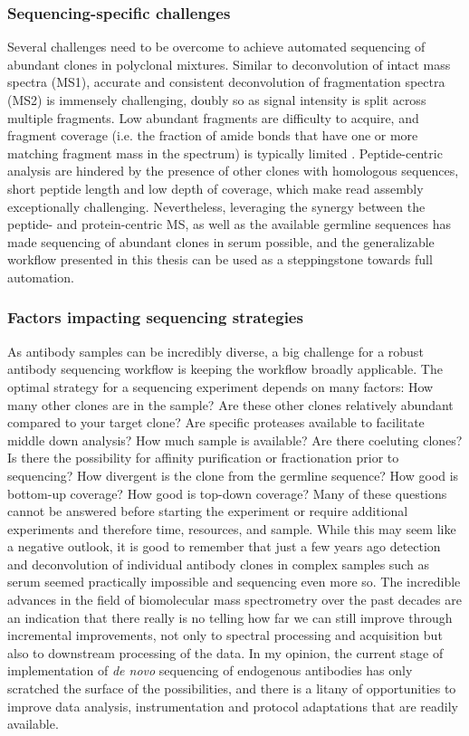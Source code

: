 \subsubsection{Sequencing-specific challenges}
Several challenges need to be overcome to achieve automated sequencing of abundant clones in polyclonal mixtures. Similar to deconvolution of intact mass spectra (MS1), accurate and consistent deconvolution of fragmentation spectra (MS2) is immensely challenging, doubly so as signal intensity is split across multiple fragments. Low abundant fragments are difficulty to acquire, and fragment coverage (i.e. the fraction of amide bonds that have one or more matching fragment mass in the spectrum) is typically limited \cite{he2018protein}. Peptide-centric analysis are hindered by the presence of other clones with homologous sequences, short peptide length and low depth of coverage, which make read assembly exceptionally challenging. Nevertheless, leveraging the synergy between the peptide- and protein-centric MS, as well as the available germline sequences has made sequencing of abundant clones in serum possible, and the generalizable workflow presented in this thesis can be used as a steppingstone towards full automation.

\subsubsection{Factors impacting sequencing strategies}
As antibody samples can be incredibly diverse, a big challenge for a robust antibody sequencing workflow is keeping the workflow broadly applicable. The optimal strategy for a sequencing experiment depends on many factors: How many other clones are in the sample? Are these other clones relatively abundant compared to your target clone? Are specific proteases available to facilitate middle down analysis? How much sample is available? Are there coeluting clones? Is there the possibility for affinity purification or fractionation prior to sequencing? How divergent is the clone from the germline sequence? How good is bottom-up coverage? How good is top-down coverage? Many of these questions cannot be answered before starting the experiment or require additional experiments and therefore time, resources, and sample. While this may seem like a negative outlook, it is good to remember that just a few years ago detection and deconvolution of individual antibody clones in complex samples such as serum seemed practically impossible and sequencing even more so. The incredible advances in the field of biomolecular mass spectrometry over the past decades are an indication that there really is no telling how far we can still improve through incremental improvements, not only to spectral processing and acquisition but also to downstream processing of the data. In my opinion, the current stage of implementation of \emph{de novo} sequencing of endogenous antibodies has only scratched the surface of the possibilities, and there is a litany of opportunities to improve data analysis, instrumentation and protocol adaptations that are readily available.

